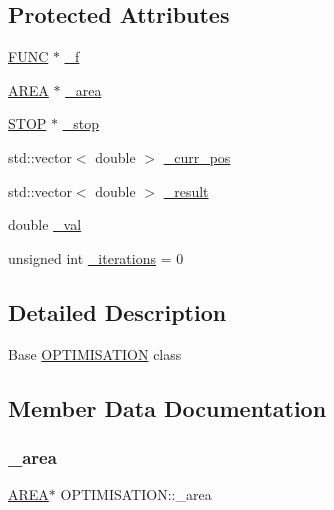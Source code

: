 \subsection*{Protected Attributes}
\begin{DoxyCompactItemize}
\item 
\hyperlink{class_f_u_n_c}{F\+U\+NC} $\ast$ \hyperlink{class_o_p_t_i_m_i_s_a_t_i_o_n_a7301208a647b51b5880ffc1a23da1453}{\+\_\+f}
\item 
\hyperlink{class_a_r_e_a}{A\+R\+EA} $\ast$ \hyperlink{class_o_p_t_i_m_i_s_a_t_i_o_n_ae7b53c1ad284d2da7293acf32dedff33}{\+\_\+area}
\item 
\hyperlink{class_s_t_o_p}{S\+T\+OP} $\ast$ \hyperlink{class_o_p_t_i_m_i_s_a_t_i_o_n_a756cffba62054d4c9f54b8575e0d771e}{\+\_\+stop}
\item 
std\+::vector$<$ double $>$ \hyperlink{class_o_p_t_i_m_i_s_a_t_i_o_n_a049bd3ae26ad1519bbdc81a434e0a886}{\+\_\+curr\+\_\+pos}
\item 
std\+::vector$<$ double $>$ \hyperlink{class_o_p_t_i_m_i_s_a_t_i_o_n_a9fe2a8559d57479f92ade3ea0fe52ef9}{\+\_\+result}
\item 
double \hyperlink{class_o_p_t_i_m_i_s_a_t_i_o_n_ab894cbac492adc44c0731f89e99e8a58}{\+\_\+val}
\item 
unsigned int \hyperlink{class_o_p_t_i_m_i_s_a_t_i_o_n_a7cff0cfa22d26eaf057526b1cc0936a2}{\+\_\+iterations} = 0
\end{DoxyCompactItemize}


\subsection{Detailed Description}
Base \hyperlink{class_o_p_t_i_m_i_s_a_t_i_o_n}{O\+P\+T\+I\+M\+I\+S\+A\+T\+I\+ON} class 

\subsection{Member Data Documentation}
\mbox{\label{class_o_p_t_i_m_i_s_a_t_i_o_n_ae7b53c1ad284d2da7293acf32dedff33}} 
\subsubsection{\texorpdfstring{\+\_\+area}{\_area}}
{\footnotesize\ttfamily \hyperlink{class_a_r_e_a}{A\+R\+EA}$\ast$ O\+P\+T\+I\+M\+I\+S\+A\+T\+I\+O\+N\+::\+\_\+area\hspace{0.3cm}{\ttfamily [protected]}}

